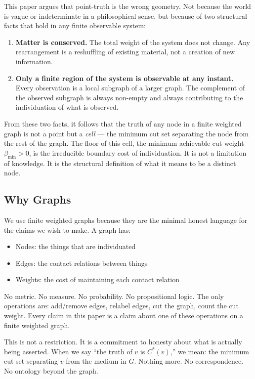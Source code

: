 \documentclass[11pt,twocolumn,a4paper]{article}
\theoremstyle{plain}
\theoremstyle{definition}
\theoremstyle{remark}
\newcommand{\bmin}{\beta_{\min}}
\begin{document}
This paper argues that point-truth is the wrong geometry. Not because the world
is vague or indeterminate in a philosophical sense, but because of two structural
facts that hold in any finite observable system:

\begin{enumerate}[label=(\roman*)]
  \item \textbf{Matter is conserved.} The total weight of the system does not
  change. Any rearrangement is a reshuffling of existing material, not a
  creation of new information.

  \item \textbf{Only a finite region of the system is observable at any
  instant.} Every observation is a local subgraph of a larger graph. The
  complement of the observed subgraph is always non-empty and always
  contributing to the individuation of what is observed.
\end{enumerate}

From these two facts, it follows that the truth of any node in a finite
weighted graph is not a point but a \emph{cell} --- the minimum cut set
separating the node from the rest of the graph. The floor of this cell,
the minimum achievable cut weight $\bmin > 0$, is the irreducible boundary
cost of individuation. It is not a limitation of knowledge. It is the
structural definition of what it means to be a distinct node.

\subsection{Why Graphs}

We use finite weighted graphs because they are the minimal honest language
for the claims we wish to make. A graph has:

\begin{itemize}
  \item Nodes: the things that are individuated
  \item Edges: the contact relations between things
  \item Weights: the cost of maintaining each contact relation
\end{itemize}

No metric. No measure. No probability. No propositional logic. The only
operations are: add/remove edges, relabel edges, cut the graph, count
the cut weight. Every claim in this paper is a claim about one of these
operations on a finite weighted graph.

This is not a restriction. It is a commitment to honesty about what is
actually being asserted. When we say ``the truth of $v$ is $C^*(v)$,'' we
mean: the minimum cut set separating $v$ from the medium in $G$. Nothing
more. No correspondence. No ontology beyond the graph.
\end{document}
